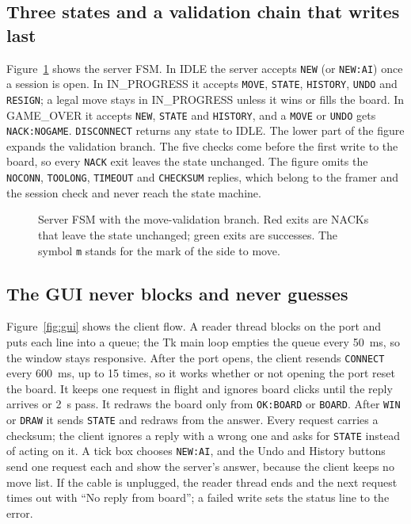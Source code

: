 \subsection{Three states and a validation chain that writes last}
Figure~\ref{fig:fsm} shows the server FSM. In IDLE the server accepts
\texttt{NEW} (or \texttt{NEW:AI}) once a session is open. In IN\_PROGRESS it accepts
\texttt{MOVE}, \texttt{STATE}, \texttt{HISTORY}, \texttt{UNDO} and \texttt{RESIGN}; a legal
move stays in IN\_PROGRESS unless it wins or fills the board. In GAME\_OVER it accepts
\texttt{NEW}, \texttt{STATE} and \texttt{HISTORY}, and a \texttt{MOVE} or \texttt{UNDO} gets
\texttt{NACK:NOGAME}. \texttt{DISCONNECT} returns any
state to IDLE. The lower part of the figure expands the validation branch. The
five checks come before the first write to the board, so every
\texttt{NACK} exit leaves the state unchanged. The figure omits the
\texttt{NOCONN}, \texttt{TOOLONG}, \texttt{TIMEOUT} and \texttt{CHECKSUM} replies, which belong
to the framer and the session check and never reach the state machine.

\begin{figure}[t]
\centering

\caption{Server FSM with the move-validation branch. Red exits are NACKs
that leave the state unchanged; green exits are successes. The symbol
\texttt{m} stands for the mark of the side to move.}
\label{fig:fsm}
\end{figure}

\subsection{The GUI never blocks and never guesses}
Figure~\ref{fig:gui} shows the client flow. A reader thread blocks on the port and
puts each line into a queue; the Tk main loop empties the queue every 50~ms, so the
window stays responsive. After the port opens, the client resends
\texttt{CONNECT} every 600~ms, up to 15 times, so it works whether or not
opening the port reset the board. It keeps one request in flight and ignores
board clicks until the reply arrives or 2~s pass. It redraws the board only from
\texttt{OK:BOARD} or \texttt{BOARD}. After \texttt{WIN} or \texttt{DRAW} it
sends \texttt{STATE} and redraws from the answer. Every request carries a checksum;
the client ignores a reply with a wrong one and asks for \texttt{STATE} instead of
acting on it. A tick box chooses \texttt{NEW:AI}, and the Undo and History buttons send
one request each and show the server's answer, because the client keeps no move list. If the cable is unplugged,
the reader thread ends and the next request times out with ``No reply from
board''; a failed write sets the status line to the error.

